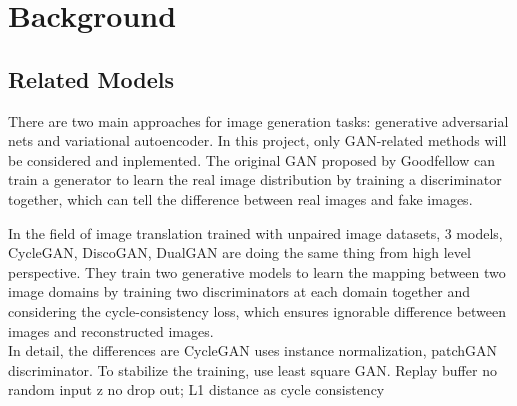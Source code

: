 \chapter{Background}\label{Ch:Background}
\section{Related Models}
There are two main approaches for image generation tasks: generative adversarial nets and variational autoencoder. In this project, only GAN-related methods will be considered and inplemented.
The original GAN proposed by Goodfellow can train a generator to learn the real image distribution by training a discriminator together, which can tell the difference between real images and fake images.

In the field of image translation trained with unpaired image datasets, 3 models, CycleGAN, DiscoGAN, DualGAN are doing the same thing
from high level perspective. They train two generative models to learn the mapping between two image domains by training two discriminators
at each domain together and considering the cycle-consistency loss, which ensures ignorable difference between images and reconstructed images.
\\
In detail, the differences are
CycleGAN uses instance normalization, patchGAN discriminator. To stabilize the training, use least square GAN. Replay buffer
              no random input z no drop out; L1 distance as cycle consistency

%


\endinput
